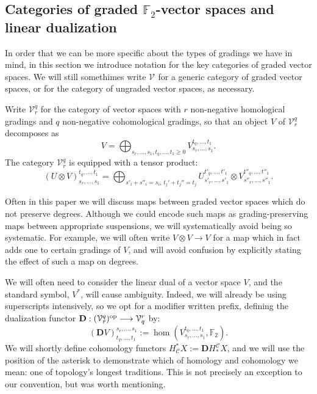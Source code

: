 \documentclass[11pt]{amsart}
\theoremstyle{plain}
\theoremstyle{definition}
\renewcommand{\to}{\longrightarrow}
\newcommand{\calC}{\mathcal{C}}
\newcommand{\calV}{\mathcal{V}}
\theoremstyle{plain}
\newcommand{\vect}[2]{\calV^{#1}_{#2}}
\newcommand{\F}{\mathbb{F}}
\newcommand{\dual}{\mathbf{D}}
\begin{document}
\begin{Conventions and notation}
\subsection{Categories of graded $\F_2$-vector spaces and linear dualization}
In order that we can be more specific about the types of gradings we have in mind, in this section we introduce  notation for the key categories of graded vector spaces. We will still somethimes write $\vect{}{}$ for a generic category of graded vector spaces, or for the category of ungraded vector spaces, as necessary.

Write $\vect{q}{r}$ for the category of vector spaces with $r$ non-negative homological gradings and $q$ non-negative cohomological gradings, so that an object $V$ of $\vect{q}{r}$ decomposes as
\[V=\bigoplus_{s_r,\ldots,s_1,t_q,\ldots,t_1\geq0}V^{t_q,\ldots,t_1}_{s_r,\ldots,s_1}.\]
The category $\vect{q}{r}$ is equipped with a tensor product:
\[(U\otimes V)^{t_q,\ldots,t_1}_{s_r,\ldots,s_1}=\bigoplus_{s'_i+s''_i=s_i,\,t_j'+t_j''=t_j}U^{t'_q,\ldots,t'_1}_{s'_r,\ldots,s'_1}\otimes V^{t''_q,\ldots,t''_1}_{s''_r,\ldots,s''_1}.\]

Often in this paper we will discuss maps between graded vector spaces which do not preserve degrees. %
Although we could encode such maps as grading-preserving maps between appropriate suspensions, we will systematically avoid being so systematic. For example, we will often write $V\otimes V\to V$ for a map which in fact adds one to certain gradings of $V$, and will avoid confusion by explicitly stating the effect of such a map on degrees.

We will often need to consider the linear dual of a vector space $V$, and the standard symbol, $V^*$, will cause ambiguity. Indeed, we will already be using superscripts intensively, so we opt for a modifier written prefix, defining the dualization functor
$\dual:(\vect{q}{r})^\textup{op}\to\vect{r}{q}$ by:
\[(\dual V)_{t_q,\ldots,t_1}^{s_r,\ldots,s_1}:=\hom(V^{t_q,\ldots,t_1}_{s_r,\ldots,s_1},\F_2).\]
We will shortly define cohomology functors
$H_{\calC}^*X:=\dual H^{\calC}_*X$, and we will use the position of the asterisk to demonstrate which of homology and cohomology we mean: one of topology's longest traditions. This is not precisely an exception to our convention, but was worth mentioning.


\end{Conventions and notation}
\end{document}
